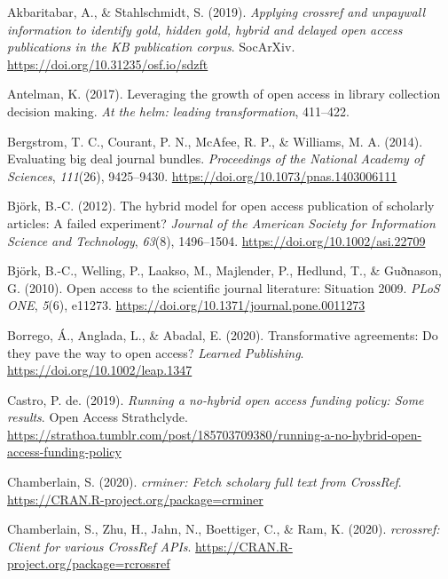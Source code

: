 \documentclass[a4paper,man,floatsintext,longtable,noextraspace,12pt]{apa6}
\newlength{\cslhangindent}
\newenvironment{cslreferences}%
  {\setlength{\parindent}{0pt}%
  \everypar{\setlength{\hangindent}{\cslhangindent}}\ignorespaces}%
  {\par}
\begin{document}
\hypertarget{refs}{}
\begin{cslreferences}
\leavevmode\hypertarget{ref-Akbaritabar_2019}{}%
Akbaritabar, A., \& Stahlschmidt, S. (2019). \emph{Applying crossref and
unpaywall information to identify gold, hidden gold, hybrid and delayed
open access publications in the KB publication corpus}. SocArXiv.
\url{https://doi.org/10.31235/osf.io/sdzft}

\leavevmode\hypertarget{ref-antelmann_2017}{}%
Antelman, K. (2017). Leveraging the growth of open access in library
collection decision making. \emph{At the helm: leading transformation},
411--422.

\leavevmode\hypertarget{ref-Bergstrom_2014}{}%
Bergstrom, T. C., Courant, P. N., McAfee, R. P., \& Williams, M. A.
(2014). Evaluating big deal journal bundles. \emph{Proceedings of the
National Academy of Sciences}, \emph{111}(26), 9425--9430.
\url{https://doi.org/10.1073/pnas.1403006111}

\leavevmode\hypertarget{ref-Bj_rk_2012}{}%
Björk, B.-C. (2012). The hybrid model for open access publication of
scholarly articles: A failed experiment? \emph{Journal of the American
Society for Information Science and Technology}, \emph{63}(8),
1496--1504. \url{https://doi.org/10.1002/asi.22709}

\leavevmode\hypertarget{ref-Bj_rk_2010}{}%
Björk, B.-C., Welling, P., Laakso, M., Majlender, P., Hedlund, T., \&
Guðnason, G. (2010). Open access to the scientific journal literature:
Situation 2009. \emph{PLoS ONE}, \emph{5}(6), e11273.
\url{https://doi.org/10.1371/journal.pone.0011273}

\leavevmode\hypertarget{ref-Borrego_2020}{}%
Borrego, Á., Anglada, L., \& Abadal, E. (2020). Transformative
agreements: Do they pave the way to open access? \emph{Learned
Publishing}. \url{https://doi.org/10.1002/leap.1347}

\leavevmode\hypertarget{ref-Castro_2019}{}%
Castro, P. de. (2019). \emph{Running a no-hybrid open access funding
policy: Some results}. Open Access Strathclyde.
\url{https://strathoa.tumblr.com/post/185703709380/running-a-no-hybrid-open-access-funding-policy}

\leavevmode\hypertarget{ref-crminer}{}%
Chamberlain, S. (2020). \emph{crminer: Fetch scholary full text from
CrossRef}. \url{https://CRAN.R-project.org/package=crminer}

\leavevmode\hypertarget{ref-rcrossref}{}%
Chamberlain, S., Zhu, H., Jahn, N., Boettiger, C., \& Ram, K. (2020).
\emph{rcrossref: Client for various CrossRef APIs}.
\url{https://CRAN.R-project.org/package=rcrossref}


\end{cslreferences}
\end{document}
